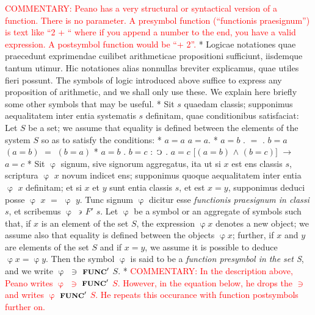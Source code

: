 \documentclass{book}
\newcommand{\C}{\mathop{\sbox0{$\displaystyle$$\reflectbox{C}$} %
\raisebox{-\height+\ht0-0.05cm}[\ht0][\dp0]{\scalebox{0.8}[0.8]{\copy0}}}\displaylimits} %
\newcommand{\such}{\thinspace \rotatebox[origin=c]{180}{$\epsilon$}}
\newcommand{\func}{\mathord{\text{{\footnotesize \textbf{FUNC}}}}}
\newcommand\commentary[1]{\textcolor{red}{COMMENTARY: #1}}
\newenvironment{translateTwoCol}
               { %
                 \columnratio{0.5, 0.5} \begin{paracol}{2}
                 \newcommand{\LAT}{\switchcolumn[0]*}
                 \newcommand{\ENG}{\switchcolumn[1]}
               }
               { %
                 \let\ENG\undefined
                 \let\LAT\undefined
                 \end{paracol}
               }
\begin{document}
\begin{translateTwoCol}
\ENG
\commentary{Peano has a very structural or syntactical version of a function.  There is no parameter.  A presymbol function (``functionis praesignum'') is text like ``2 + `` where if you append a number to the end, you have a valid expression.   A postsymbol function would be ``+ 2''.} 
\LAT  
Logicae notationes quae praecedunt exprimendae cuilibet arithmeticae propositioni sufficiunt, iisdemque tantum utimur. Hic notationes alias nonnullas breviter explicamus, quae utiles fieri possunt.
\ENG
The symbols of logic introduced above suffice to express any proposition of arithmetic, and we shall only use these.  We explain here briefly some other symbols that may be useful. %
\LAT
Sit $s$ quaedam classis; supponimus aequalitatem inter entia systematis $s$ definitam, quae conditionibus satisfaciat:
\ENG
Let $S$ be a set; we assume that equality is defined between the elements of the system $S$ so as to satisfy the conditions:
\LAT
\hspace{1.06cm} $a=a$
\ENG
\hspace{1.06cm} $a=a$.
\LAT
\hspace{1.06cm} $a=b$ $.$ $=$ $.$ $b=a$
\ENG
\hspace{1.06cm} $(a=b)$ $=$ $(b=a)$
\LAT
\hspace{1.06cm} $a=b$ . $b=c$ $:$ $\C$ $.$ $a=c$
\ENG
\hspace{1.06cm} $[(a=b)$ $\wedge$ $(b=c)]$ $\rightarrow$ $a=c$
\LAT
Sit $\upvarphi$ signum, sive signorum aggregatus, ita ut si $x$ est ens classis $s$, scriptura $\upvarphi$ $x$ novum indicet ens; supponimus quoque aequalitatem inter entia $\upvarphi$ $x$ definitam; et si $x$ et $y$ sunt entia classis $s$, et est $x=y$, supponimus deduci posse $\upvarphi$ $x$ $=$ $\upvarphi$ $y$. Tunc signum $\upvarphi$ dicitur esse \emph{functionis praesignum in classi} $s$, et scribemus $\upvarphi$ $\such$ $F'$ $s$.
\ENG
Let $\upvarphi$ be a symbol or an aggregate of symbols such that, if $x$ is an element of the set $S$, the expression $\upvarphi x$ denotes a new object; we assume also that equality is defined between the objects $\upvarphi x$; further, if $x$ and $y$ are elements of the set $S$ and if $x = y$, we assume it is possible to deduce $\upvarphi x = \upvarphi y$. Then the symbol $\upvarphi$ is said to be a \emph{function presymbol in the set S}, and we write $\upvarphi$ $\ni$ $\func'$ $S$.
\LAT
\ENG
\commentary{In the description above, Peano writes $\upvarphi$ $\ni$ $\func'$ $S$.  However, in the equation below, he drops the $\ni$ and writes $\upvarphi$ $\func'$ $S$.  He repeats this occurance with function postsymbols further on.}

\end{translateTwoCol}
\end{document}
